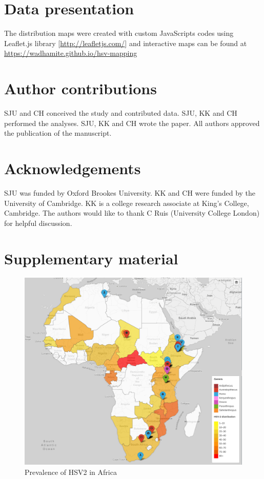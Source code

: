 \documentclass[fleqn,10pt]{wlscirep}
\begin{document}
\section*{Data presentation}
The distribution maps were created with custom JavaScripts codes using Leaflet.js library [\url{http://leafletjs.com/}] and interactive maps can be found at \url{https://wadhamite.github.io/hsv-mapping}

\section*{Author contributions}
SJU and CH conceived the study and contributed data. SJU, KK and CH performed the analyses. SJU, KK and CH wrote the paper. All authors approved the publication of the manuscript.

\section*{Acknowledgements}
SJU was funded by Oxford Brookes University. KK and CH were funded by the University of Cambridge. KK is a college research associate at King’s College, Cambridge. The authors would like to thank C Ruis (University College London) for helpful discussion. 



\clearpage
\section*{Supplementary material}
\renewcommand\thefigure{A.\arabic{figure}}    
\setcounter{figure}{0} 
\renewcommand\thetable{A.\arabic{figure}}    
\setcounter{table}{0} 

\begin{figure}[!h]
	\centering
	\includegraphics[width=\textwidth]{figs/fossils}
	\caption{Prevalence of HSV2 in Africa}
	\label{fig:hsv2}   
\end{figure}  
\end{document}
